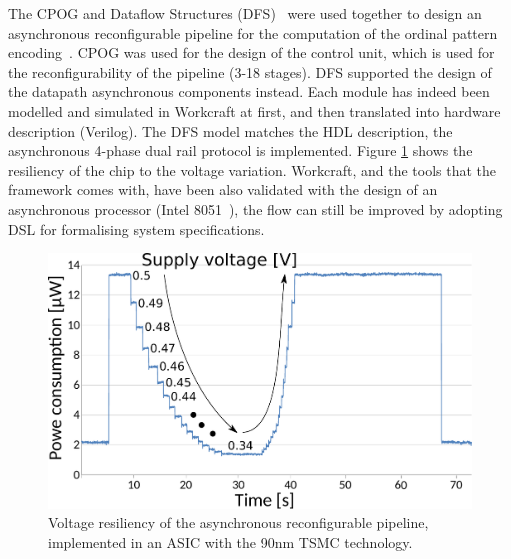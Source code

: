 \documentclass[conference]{IEEEtran}
\begin{document}
The CPOG and Dataflow Structures (DFS)~\cite{DFS} were used together to design an asynchronous
reconfigurable pipeline for the computation of the ordinal pattern encoding~\cite{OPE}. CPOG was used
for the design of the control unit, which is used for the reconfigurability of the pipeline
(3-18 stages). DFS supported the design of the datapath asynchronous components instead. Each
module has indeed been modelled and simulated in Workcraft at first, and then translated into
hardware description (Verilog). The DFS model matches the HDL description, the asynchronous
4-phase dual rail protocol is implemented. Figure \ref{fig:voltage-resiliency} shows the
resiliency of the chip to the voltage variation. Workcraft, and the tools that the framework
comes with, have been also validated with the design of an asynchronous processor (Intel
8051~\cite{rec-proc}), the flow can still be improved by adopting DSL for formalising system
specifications.

\begin{figure}[ht!]
\begin{center}
	\includegraphics[width=\linewidth]{FIG/ope-chip.pdf}
	\caption{Voltage resiliency of the asynchronous reconfigurable pipeline, implemented in
	an ASIC with the 90nm TSMC technology.}
	\label{fig:voltage-resiliency}
\end{center}
\end{figure}

%
%
\end{document}
